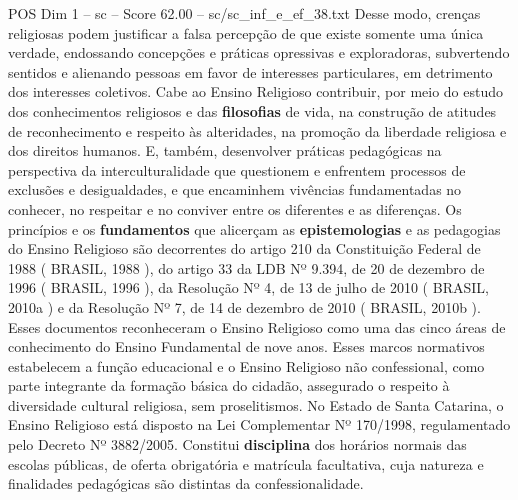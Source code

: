 \begin{textsample}{POS Dim 1 – sc – Score 62.00 – sc/sc\_inf\_e\_ef\_38.txt}
Desse modo, crenças religiosas podem justificar a falsa percepção de que existe somente uma única verdade, endossando concepções e práticas opressivas e exploradoras, subvertendo sentidos e alienando pessoas em favor de interesses particulares, em detrimento dos interesses coletivos.
Cabe ao Ensino Religioso contribuir, por meio do estudo dos conhecimentos religiosos e das \textbf{filosofias} de vida, na construção de atitudes de reconhecimento e respeito às alteridades, na promoção da liberdade religiosa e dos direitos humanos.
E, também, desenvolver práticas pedagógicas na perspectiva da interculturalidade que questionem e enfrentem processos de exclusões e desigualdades, e que encaminhem vivências fundamentadas no conhecer, no respeitar e no conviver entre os diferentes e as diferenças.
Os princípios e os \textbf{fundamentos} que alicerçam as \textbf{epistemologias} e as pedagogias do Ensino Religioso são decorrentes do artigo 210 da Constituição Federal de 1988 ( BRASIL, 1988 ), do artigo 33 da LDB Nº 9.394, de 20 de dezembro de 1996 ( BRASIL, 1996 ), da Resolução Nº 4, de 13 de julho de 2010 ( BRASIL, 2010a ) e da Resolução Nº 7, de 14 de dezembro de 2010 ( BRASIL, 2010b ).
Esses documentos reconheceram o Ensino Religioso como uma das cinco áreas de conhecimento do Ensino Fundamental de nove anos.
Esses marcos normativos estabelecem a função educacional e o Ensino Religioso não confessional, como parte integrante da formação básica do cidadão, assegurado o respeito à diversidade cultural religiosa, sem proselitismos.
No Estado de Santa Catarina, o Ensino Religioso está disposto na Lei Complementar Nº 170/1998, regulamentado pelo Decreto Nº 3882/2005.
Constitui \textbf{disciplina} dos horários normais das escolas públicas, de oferta obrigatória e matrícula facultativa, cuja natureza e finalidades pedagógicas são distintas da confessionalidade.

\end{textsample}
